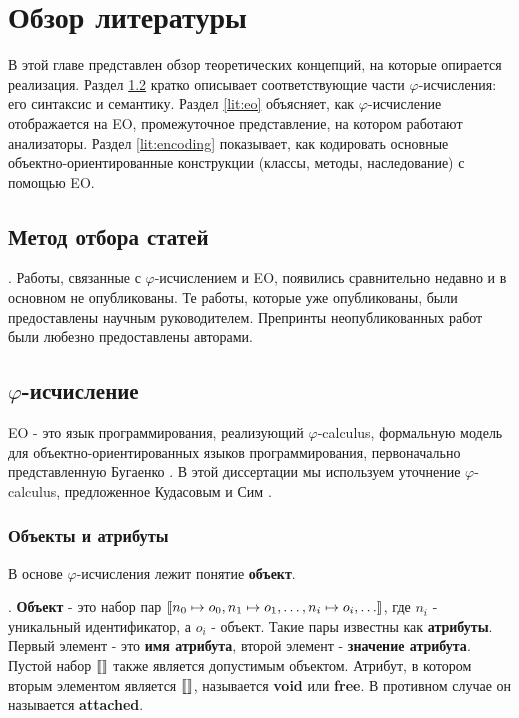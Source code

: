 \chapter{Обзор литературы}
\label{chap:lr}
В этой главе представлен обзор теоретических концепций, на которые опирается реализация. Раздел \ref{lit:phicalc} кратко описывает соответствующие части $\varphi$-исчисления: его синтаксис и семантику. Раздел \ref{lit:eo} объясняет, как $\varphi$-исчисление отображается на EO, промежуточное представление, на котором работают анализаторы. Раздел \ref{lit:encoding} показывает, как кодировать основные объектно-ориентированные конструкции (классы, методы, наследование) с помощью EO. 

\section{Метод отбора статей}.
Работы, связанные с $\varphi$-исчислением и EO, появились сравнительно недавно и в основном не опубликованы. Те работы, которые уже опубликованы, были предоставлены научным руководителем. Препринты неопубликованных работ были любезно предоставлены авторами. 

\section{$\varphi$-исчисление}
\label{lit:phicalc}

EO - это язык программирования, реализующий $\varphi$-calculus, формальную модель для объектно-ориентированных языков программирования, первоначально представленную Бугаенко \cite{eolang}. В этой диссертации мы используем уточнение $\varphi$-calculus, предложенное Кудасовым и Сим \cite{kudasov}.

\subsection{Объекты и атрибуты}
В основе $\varphi$-исчисления лежит понятие \textbf{объект}.

\begin{definition}.
    \textbf{Объект} - это набор пар $\llbracket n_0 \mapsto o_0, n_1 \mapsto o_1, \hdots, n_i \mapsto o_i, \hdots \rrbracket$, где $n_i$ - уникальный идентификатор, а $o_i$ - объект. Такие пары известны как \textbf{атрибуты}. Первый элемент - это \textbf{имя атрибута}, второй элемент - \textbf{значение атрибута}. Пустой набор $\llbracket  \rrbracket$ также является допустимым объектом. Атрибут, в котором вторым элементом является $\llbracket  \rrbracket$, называется \textbf{void} или \textbf{free}. В противном случае он называется \textbf{attached}.
\end{definition}

